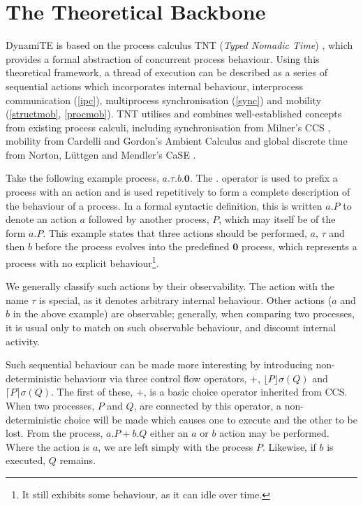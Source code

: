 \documentclass{sig-alternate}
\newcommand{\nil}{\textbf{0}}
\newcommand{\timeout}[3]{\lfloor{#1}\rfloor {#2} ({#3})}
\newcommand{\stimeout}[3]{\lceil{#1}\rceil {#2} ({#3})}
\begin{document}
\section{The Theoretical Backbone}
\label{backbone}

DynamiTE is based on the process calculus TNT (\emph{Typed Nomadic
Time}) \cite{hughes:nt, tnt}, which provides a formal abstraction of
concurrent process behaviour.  Using this theoretical framework, a
thread of execution can be described as a series of sequential actions
which incorporates internal behaviour, interprocess communication
(\ref{ipc}), multiprocess synchronisation (\ref{sync}) and mobility
(\ref{structmob}, \ref{procmob}).  TNT utilises and combines
well-established concepts from existing process calculi, including
synchronisation from Milner's CCS \cite{milner:ccs}, mobility from
Cardelli and Gordon's Ambient Calculus \cite{amb} and global discrete
time from Norton, L{\"u}ttgen and Mendler's CaSE \cite{case}.

Take the following example process, $a.\tau.b.\nil$.  The $.$ operator
is used to prefix a process with an action and is used repetitively to
form a complete description of the behaviour of a process.  In a formal
syntactic definition, this is written $a.P$ to denote an action $a$
followed by another process, $P$, which may itself be of the form $a.P$.
This example states that three actions should be performed, $a$, $\tau$
and then $b$ before the process evolves into the predefined $\nil$
process, which represents a process with no explicit
behaviour\footnote{It still exhibits some behaviour, as it can idle over
time.}.

We generally classify such actions by their observability.  The action
with the name $\tau$ is special, as it denotes arbitrary internal
behaviour.  Other actions ($a$ and $b$ in the above example) are
observable; generally, when comparing two processes, it is usual only to
match on such observable behaviour, and discount internal activity.

Such sequential behaviour can be made more interesting by introducing
non-deterministic behaviour via three control flow operators, $+$,
$\timeout{P}{\sigma}{Q}$ and $\stimeout{P}{\sigma}{Q}$.  The first of
these, $+$, is a basic choice operator inherited from CCS.  When two
processes, $P$ and $Q$, are connected by this operator, a
non-deterministic choice will be made which causes one to execute and
the other to be lost.  From the process, $a.P + b.Q$ either an $a$ or
$b$ action may be performed.  Where the action is $a$, we are left
simply with the process $P$.  Likewise, if $b$ is executed, $Q$ remains.
\end{document}
